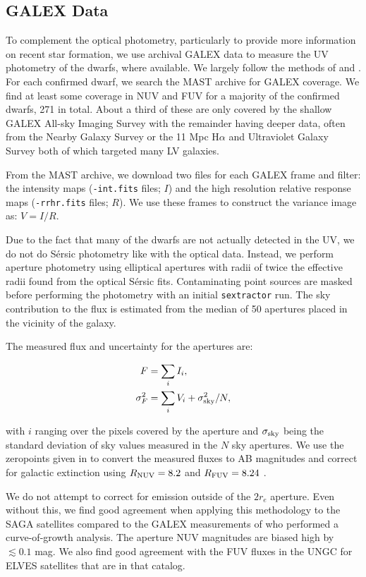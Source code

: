 \documentclass[twocolumn]{aastex62}
\newcommand{\beq}{\begin{equation}\begin{aligned}}
\newcommand{\eeq}{\end{aligned}\end{equation}}
\begin{document}
\subsection{GALEX Data}
\label{sec:galex}
To complement the optical photometry, particularly to provide more information on recent star formation, we use archival GALEX \citep{galex} data to measure the UV photometry of the dwarfs, where available. We largely follow the methods of \citet{greco2018_two} and \citet{karunakaran2021}. For each confirmed dwarf, we search the MAST archive for GALEX coverage. We find at least some coverage in NUV and FUV for a majority of the confirmed dwarfs, 271 in total. About a third of these are only covered by the shallow GALEX All-sky Imaging Survey with the remainder having deeper data, often from the Nearby Galaxy Survey \citep{galex2007} or the 11 Mpc H$\alpha$ and Ultraviolet Galaxy Survey \citep[11HUGS;][]{kennicutt2008, lee2011} both of which targeted many LV galaxies. 

From the MAST archive, we download two files for each GALEX frame and filter: the intensity maps (\texttt{-int.fits} files; $I$) and the high resolution relative response maps (\texttt{-rrhr.fits} files; $R$). We use these frames to construct the variance image as: $V = I/R$.

Due to the fact that many of the dwarfs are not actually detected in the UV, we do not do S\'{e}rsic photometry like with the optical data. Instead, we perform aperture photometry using elliptical apertures with radii of twice the effective radii found from the optical S\'{e}rsic fits. Contaminating point sources are masked before performing the photometry with an initial \texttt{sextractor} \citep{sextractor} run. The sky contribution to the flux is estimated from the median of 50 apertures placed in the vicinity of the galaxy. 

The measured flux and uncertainty for the apertures are: 

\beq
F &= \sum_i I_i, \\
\sigma^2_F &= \sum_i V_i  + \sigma_{\rm sky}^2/N,
\eeq

with $i$ ranging over the pixels covered by the aperture and $\sigma_{\rm sky}$ being the standard deviation of sky values measured in the $N$ sky apertures. We use the zeropoints given in \citet{morrissey2007} to convert the measured fluxes to AB magnitudes and correct for galactic extinction using $R_{\rm NUV}=8.2$ and $R_{\rm FUV}=8.24$ \citep{wyder2007}. 

We do not attempt to correct for emission outside of the $2r_e$ aperture. Even without this, we find good agreement when applying this methodology to the SAGA satellites \citep{mao2020} compared to the GALEX measurements of \citet{karunakaran2021} who performed a curve-of-growth analysis. The aperture NUV magnitudes are biased high by $\lesssim0.1$ mag. We also find good agreement with the FUV fluxes in the UNGC \citep{karachentsev2013} for ELVES satellites that are in that catalog. 
\end{document}
